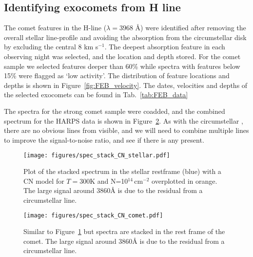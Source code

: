 \documentclass{aa}
\newcommand{\kms}{km s$^{-1}$}
\begin{document}
\subsection{Identifying exocomets from \texorpdfstring{}{CaII} H line}\label{sect:FEBid}

The comet features in the  H-line ($\lambda=3968$ \AA) were identified after removing the overall stellar line-profile and avoiding the absorption from the circumstellar disk by excluding the central 8 \kms{}.
%
The deepest absorption feature in each observing night was selected, and the location and depth stored.
%
For the comet sample we selected features deeper than 60\% while spectra with features below 15\% were flagged as `low activity'.
%
The distribution of feature locations and depths is shown in Figure~\ref{fig:FEB_velocity}. The dates, velocities and depths of the selected exocomets can be found in Tab.~\ref{tab:FEB_data}

The spectra for the strong comet sample were coadded, and the combined spectrum for the HARPS data is shown in Figure~\ref{fig:spec_CN_comet_frame}.
%
As with the circumstellar , there are no obvious lines from  visible, and we will need to combine multiple lines to improve the signal-to-noise ratio, and see if there is any  present. 

\begin{figure}
    \begin{centering}
        \texttt{[image: figures/spec\_stack\_CN\_stellar.pdf]}
        \caption{Plot of the stacked spectrum in the stellar restframe (blue) with a CN model for $T=$300K and N=10$^{14}$\,cm$^{-2}$ overplotted in orange.
        The large signal around 3860\AA{} is due to the residual from a circumstellar  line.}
        \label{fig:spec_CN_stellar_frame}
    \end{centering}
\end{figure}

\begin{figure}
    \begin{centering}
        \texttt{[image: figures/spec\_stack\_CN\_comet.pdf]}
        \caption{Similar to Figure~\ref{fig:spec_CN_stellar_frame} but spectra are stacked in the rest frame of the comet. The large signal around 3860\AA{} is due to the residual from a circumstellar  line.}
        \label{fig:spec_CN_comet_frame}
    \end{centering}
\end{figure}
\end{document}
